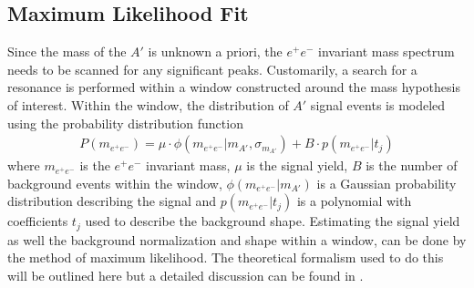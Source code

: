 \subsection{Maximum Likelihood Fit}

Since the mass of the $A'$ is unknown a priori, the 
$e^+e^-$ invariant mass spectrum needs to be scanned for any significant peaks.
Customarily, a search for a resonance is performed within a
window constructed around the mass hypothesis of interest.  Within the window,
the distribution of $A'$ signal events is modeled using the probability 
distribution function
\begin{equation}
    \begin{split}
    P(m_{e^+e^-}) 
        = 
        \mu \cdot \phi(m_{e^+e^-} | m_{A'}, \sigma_{m_{A'}}) + B\cdot p(m_{e^+e^-} | t_j)
    \end{split}
\end{equation}
where $m_{e^+e^-}$ is the $e^+e^-$ invariant mass, $\mu$ is the signal yield,
$B$ is the number of background events within the window, 
$\phi(m_{e^+e^-} | m_{A'})$ is a Gaussian probability distribution describing
the signal and $p(m_{e^+e^-} | t_j)$ is a polynomial with coefficients $t_j$
used to describe the background shape.
Estimating the 
signal yield as well the background normalization and shape within a window, can be
done by the method of maximum likelihood.  The theoretical formalism
used to do this will be outlined here but a detailed discussion can be found in
\cite{Cowan:2010js}.

